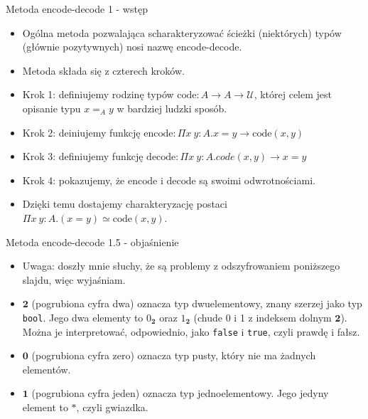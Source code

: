 \documentclass{beamer}
\newcommand{\U}{\mathcal{U}}
\newcommand{\code}{\text{code}}
\newcommand{\encode}{\text{encode}}
\newcommand{\decode}{\text{decode}}
\begin{document}
\begin{frame}{Metoda encode-decode 1 - wstęp}
\begin{itemize}
	\item Ogólna metoda pozwalająca scharakteryzować ścieżki (niektórych) typów  (głównie pozytywnych) nosi nazwę encode-decode.
	\item Metoda składa się z czterech kroków.
	\item Krok 1: definiujemy rodzinę typów $\code : A \to A \to \U$, której celem jest opisanie typu $x =_A y$ w bardziej ludzki sposób.
	\item Krok 2: deiniujemy funkcję $\encode : \Pi x\ y : A. x = y \to \code(x, y)$
	\item Krok 3: definiujemy funkcję $\decode : \Pi x\ y : A. code(x, y) \to x = y$
	\item Krok 4: pokazujemy, że $\encode$ i $\decode$ są swoimi odwrotnościami.
	\item Dzięki temu dostajemy charakteryzację postaci $\Pi x\ y : A. (x = y) \simeq \code(x, y)$.
\end{itemize}
\end{frame}

\begin{frame}{Metoda encode-decode 1.5 - objaśnienie}
\begin{itemize}
	\item Uwaga: doszły mnie słuchy, że są problemy z odszyfrowaniem poniższego slajdu, więc wyjaśniam.
	\item $\textbf{2}$ (pogrubiona cyfra dwa) oznacza typ dwuelementowy, znany szerzej jako typ \texttt{bool}. Jego dwa elementy to $0_{\textbf{2}}$ oraz $1_{\textbf{2}}$ (chude 0 i 1 z indeksem dolnym $\textbf{2}$). Można je interpretować, odpowiednio, jako \texttt{false} i \texttt{true}, czyli prawdę i fałsz.
	\item $\textbf{0}$ (pogrubiona cyfra zero) oznacza typ pusty, który nie ma żadnych elementów.
	\item $\textbf{1}$ (pogrubiona cyfra jeden) oznacza typ jednoelementowy. Jego jedyny element to $*$, czyli gwiazdka.
\end{itemize}
\end{frame}
\end{document}
